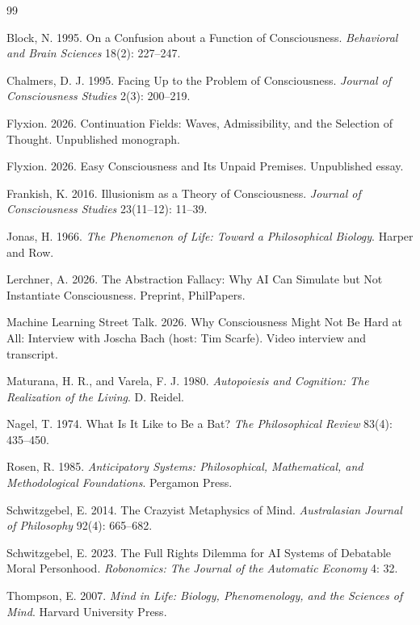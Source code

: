\documentclass[11pt]{article}
\theoremstyle{definition}
\theoremstyle{plain}
\theoremstyle{remark}
\begin{document}
\begin{thebibliography}{99}
\small

 Block, N. 1995. On a Confusion about a Function of Consciousness. \emph{Behavioral and Brain Sciences} 18(2): 227--247.

 Chalmers, D. J. 1995. Facing Up to the Problem of Consciousness. \emph{Journal of Consciousness Studies} 2(3): 200--219.

 Flyxion. 2026. Continuation Fields: Waves, Admissibility, and the Selection of Thought. Unpublished monograph.

 Flyxion. 2026. Easy Consciousness and Its Unpaid Premises. Unpublished essay.

 Frankish, K. 2016. Illusionism as a Theory of Consciousness. \emph{Journal of Consciousness Studies} 23(11--12): 11--39.

 Jonas, H. 1966. \emph{The Phenomenon of Life: Toward a Philosophical Biology}. Harper and Row.

 Lerchner, A. 2026. The Abstraction Fallacy: Why AI Can Simulate but Not Instantiate Consciousness. Preprint, PhilPapers.

 Machine Learning Street Talk. 2026. Why Consciousness Might Not Be Hard at All: Interview with Joscha Bach (host: Tim Scarfe). Video interview and transcript.

 Maturana, H. R., and Varela, F. J. 1980. \emph{Autopoiesis and Cognition: The Realization of the Living}. D. Reidel.

 Nagel, T. 1974. What Is It Like to Be a Bat? \emph{The Philosophical Review} 83(4): 435--450.

 Rosen, R. 1985. \emph{Anticipatory Systems: Philosophical, Mathematical, and Methodological Foundations}. Pergamon Press.

 Schwitzgebel, E. 2014. The Crazyist Metaphysics of Mind. \emph{Australasian Journal of Philosophy} 92(4): 665--682.

 Schwitzgebel, E. 2023. The Full Rights Dilemma for AI Systems of Debatable Moral Personhood. \emph{Robonomics: The Journal of the Automatic Economy} 4: 32.

 Thompson, E. 2007. \emph{Mind in Life: Biology, Phenomenology, and the Sciences of Mind}. Harvard University Press.

\end{thebibliography}
\end{document}
